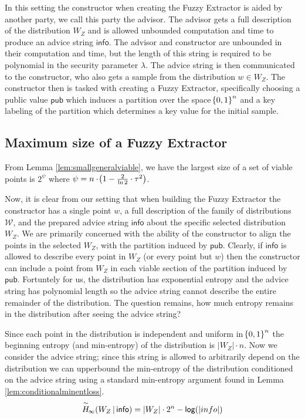 In this setting the constructor when creating the Fuzzy Extractor is aided by another party, we call this party the advisor. 
The advisor gets a full description of the distribution $W_Z$ and is allowed unbounded computation and time to produce an advice string $\mathsf{info}$. 
The advisor and constructor are unbounded in their computation and time, but the length of this string is required to be polynomial in the security parameter $\lambda$. 
The advice string is then communicated to the constructor, who also gets a sample from the distribution $w \in W_Z$. 
The constructor then is tasked with creating a Fuzzy Extractor, specifically choosing a public value $\mathsf{pub}$ which induces a partition over the space $\!\left\{ 0,1 \right\}^{n}$ and a key labeling of the partition which determines a key value for the initial sample.

\subsection{Maximum size of a Fuzzy Extractor}
From Lemma \ref{lem:smallgeneralviable}, we have the largest size of a set of viable points is $2^{\psi}$ where $\psi = n \cdot \!\left(1 - \frac{2}{\ln{2}} \cdot \tau^{2}\right)$.

Now, it is clear from our setting that when building the Fuzzy Extractor the constructor has a single point $w$, a full description of the family of distributions $\mathcal{W}$, and the prepared advice string $\mathsf{info}$ about the specific selected distribution $W_Z$. 
We are primarily concerned with the ability of the constructor to align the points in the selected $W_Z$, with the partition induced by $\mathsf{pub}$. 
Clearly, if $\mathsf{info}$ is allowed to describe every point in $W_Z$ (or every point but $w$) then the constructor can include a point from $W_Z$ in each viable section of the partition induced by $\mathsf{pub}$. 
Fortuntely for us, the distribution has exponential entropy and the advice string has polynomial length so the advice string cannot describe the entire remainder of the distribution. 
The question remains, how much entropy remains in the distribution after seeing the advice string? 

Since each point in the distribution is independent and uniform in $\!\left\{ 0,1 \right\}^{n}$ the beginning  entropy (and min-entropy) of the distribution is $|W_Z| \cdot n$. 
Now we consider the advice string; since this string is allowed to arbitrarily depend on the distribution we can upperbound the min-entropy of the distribution conditioned on the advice string using a standard min-entropy argument found in Lemma \ref{lem:conditionalminentloss}. 
\[
    \overset{\sim}{H}\!_{\infty}\!\left(W_Z\,|\,\mathsf{info}\right) = |W_Z| \cdot 2^n - \mathsf{log}\!\left(|info|\right)
\]
